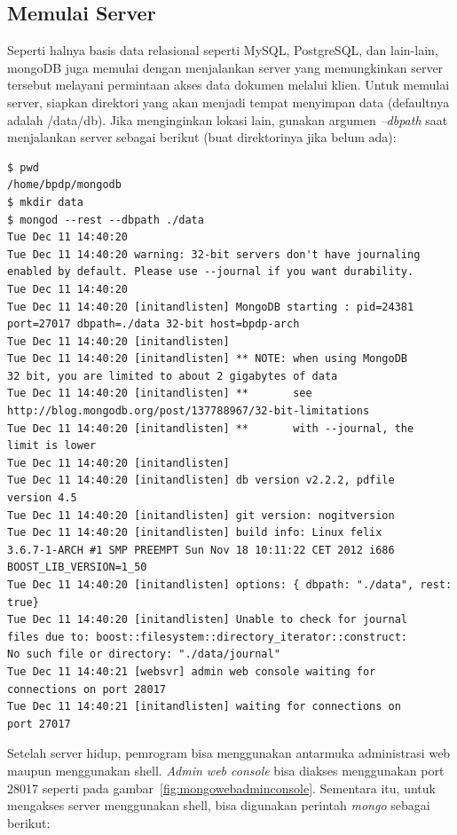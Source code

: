 \subsection{Memulai Server}
Seperti halnya basis data relasional seperti MySQL, PostgreSQL, dan lain-lain, mongoDB juga memulai dengan menjalankan server yang memungkinkan server tersebut melayani permintaan akses data dokumen melalui klien. Untuk memulai server, siapkan direktori yang akan menjadi tempat menyimpan data (defaultnya adalah /data/db). Jika menginginkan lokasi lain, gunakan argumen \textit{--dbpath} saat menjalankan server sebagai berikut (buat direktorinya jika belum ada):

\lstset{language=bash,caption=Menjalankan server MongoDB (mongod)}
\begin{lstlisting}
$ pwd
/home/bpdp/mongodb
$ mkdir data
$ mongod --rest --dbpath ./data
Tue Dec 11 14:40:20 
Tue Dec 11 14:40:20 warning: 32-bit servers don't have journaling 
enabled by default. Please use --journal if you want durability.
Tue Dec 11 14:40:20 
Tue Dec 11 14:40:20 [initandlisten] MongoDB starting : pid=24381 
port=27017 dbpath=./data 32-bit host=bpdp-arch
Tue Dec 11 14:40:20 [initandlisten] 
Tue Dec 11 14:40:20 [initandlisten] ** NOTE: when using MongoDB 
32 bit, you are limited to about 2 gigabytes of data
Tue Dec 11 14:40:20 [initandlisten] **       see 
http://blog.mongodb.org/post/137788967/32-bit-limitations
Tue Dec 11 14:40:20 [initandlisten] **       with --journal, the 
limit is lower
Tue Dec 11 14:40:20 [initandlisten] 
Tue Dec 11 14:40:20 [initandlisten] db version v2.2.2, pdfile 
version 4.5
Tue Dec 11 14:40:20 [initandlisten] git version: nogitversion
Tue Dec 11 14:40:20 [initandlisten] build info: Linux felix 
3.6.7-1-ARCH #1 SMP PREEMPT Sun Nov 18 10:11:22 CET 2012 i686 
BOOST_LIB_VERSION=1_50
Tue Dec 11 14:40:20 [initandlisten] options: { dbpath: "./data", rest: true}
Tue Dec 11 14:40:20 [initandlisten] Unable to check for journal 
files due to: boost::filesystem::directory_iterator::construct: 
No such file or directory: "./data/journal"
Tue Dec 11 14:40:21 [websvr] admin web console waiting for 
connections on port 28017
Tue Dec 11 14:40:21 [initandlisten] waiting for connections on 
port 27017
\end{lstlisting}

Setelah server hidup, pemrogram bisa menggunakan antarmuka administrasi web maupun menggunakan shell. \textit{Admin web console} bisa diakses menggunakan port 28017 seperti pada gambar~\ref{fig:mongowebadminconsole}. Sementara itu, untuk mengakses server menggunakan shell, bisa digunakan perintah \textit{mongo} sebagai berikut:


